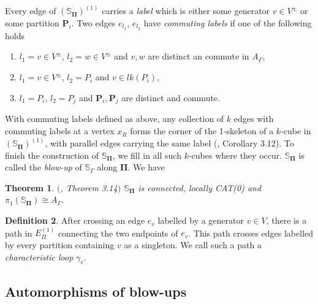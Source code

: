 \documentclass[11pt]{amsart}
\newtheorem{thm}{Theorem}
\numberwithin{thm}{section}
\theoremstyle{remark}
\theoremstyle{definition}
\newtheorem{definition}[thm]{Definition}
\newcommand{\Sa}{\mathbb{S}}
\begin{document}
Every edge of $(\Sa_{\mathbf{\Pi}})^{(1)}$ carries a \emph{label} which is either some generator $v\in V^{\pm}$ or some partition $\textbf{P}_i$. Two edges $e_{l_1}$, $e_{l_2}$ have \emph{commuting labels} if one of the following holds\begin{enumerate}
\item $l_1=v\in V^{\pm}$, $l_2=w\in V^{\pm}$ and $v,w$ are distinct an commute in $A_\Gamma$,
\item $l_1=v\in V^{\pm}$, $l_2=P_i$ and $v\in lk(P_i)$,
\item $l_1=P_i$, $l_2=P_j$ and $\textbf{P}_i,\textbf{P}_j$ are distinct and commute.  
\end{enumerate}

With commuting labels defined as above, any collection of $k$ edges with commuting labels at a vertex $x_R$ forms the corner of the 1-skeleton of a $k$-cube in  $(\Sa_{\mathbf{\Pi}})^{(1)}$, with parallel edges carrying the same label (\cite{CSV12}, Corollary 3.12). To finish the construction of  $\Sa_{\mathbf{\Pi}}$, we fill in all such $k$-cubes where they occur. $\Sa_{\mathbf{\Pi}}$ is called the \emph{blow-up} of $\Sa_\Gamma$ along $\mathbf{\Pi}$.  We have


\begin{thm}\label{CATBlowup} $($\cite{CSV12}, Theorem 3.14$)$ $\Sa_{\mathbf{\Pi}}$ is connected, locally CAT(0) and $\pi_1(\Sa_{\mathbf{\Pi}})\cong A_\Gamma$.
\end{thm}

\begin{definition}After crossing an edge $e_v$ labelled by a generator $v\in V$, there is a path in $E_\Pi^{(1)}$ connecting the two endpoints of $e_v$.  This path crosses edges labelled by every partition containing $v$ as a singleton.  We call such a path a \emph{characteristic loop} $\gamma_v$.  
\end{definition}

\subsection{Automorphisms of blow-ups}
\end{document}
